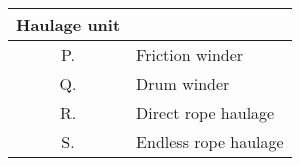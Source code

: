 \begin{tabular}[12pt]{ |c|l| }
\hline
\textbf{Haulage unit} & \\ \hline
P. & Friction winder \\ \hline
Q. & Drum winder \\ \hline
R. & Direct rope haulage \\ \hline
S. & Endless rope haulage \\ \hline
\end{tabular}
